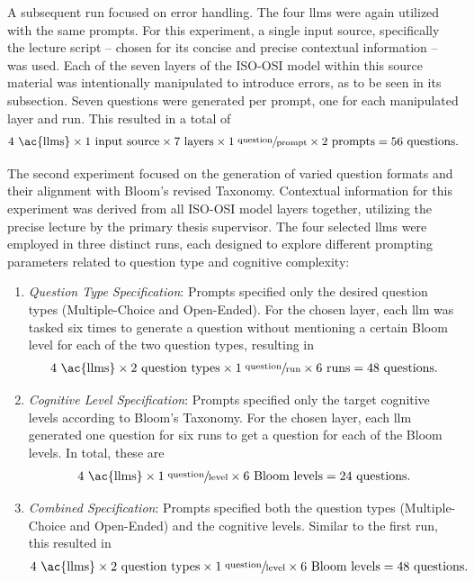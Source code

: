  A subsequent run focused on error handling. The four \ac{llms} were again utilized with the same prompts. For this experiment, a single input source, specifically the lecture script -- chosen for its concise and precise contextual information -- was used. Each of the seven layers of the ISO-OSI model within this source material was intentionally manipulated to introduce errors, as to be seen in its  subsection. Seven questions were generated per prompt, one for each manipulated layer and run. This resulted in a total of \begin{align}4 \text{ \ac{llms}} \times 1 \text{ input source} \times 7 \text{ layers} \times 1 \sfrac{\text{ question}}{\text{prompt}} \times 2 \text{ prompts} = 56 \text{ questions.}\end{align}

\pagebreak

 The second experiment focused on the generation of varied question formats and their alignment with Bloom's revised Taxonomy. Contextual information for this experiment was derived from all ISO-OSI model layers together, utilizing the precise lecture  by the primary thesis supervisor. The four selected \ac{llms} were employed in three distinct runs, each designed to explore different prompting parameters related to question type and cognitive complexity:

\begin{enumerate}
    \item \textit{Question Type Specification}: Prompts specified only the desired question types (Multiple-Choice and Open-Ended). For the chosen layer, each \ac{llm} was tasked six times to generate a question without mentioning a certain Bloom level for each of the two question types, resulting in \begin{align}4 \text{ \ac{llms}} \times 2 \text{ question types} \times 1 \sfrac{\text{ question}}{\text{run}}\times 6 \text{ runs} = 48 \text{ questions.}\end{align}
    \item \textit{Cognitive Level Specification}: Prompts specified only the target cognitive levels according to Bloom's Taxonomy. For the chosen layer, each \ac{llm} generated one question for six runs to get a question for each of the Bloom levels. In total, these are  \begin{align}4 \text{ \ac{llms}} \times 1 \sfrac{\text{ question}}{\text{level}} \times 6 \text{ Bloom levels} = 24 \text{ questions.}\end{align}
    \item \textit{Combined Specification}: Prompts specified both the question types (Multiple-Choice and Open-Ended) and the cognitive levels. Similar to the first run, this resulted in \begin{align}4 \text{ \ac{llms}} \times 2 \text{ question types} \times 1 \sfrac{\text{ question}}{\text{level}} \times 6 \text{ Bloom levels} = 48 \text{ questions.}\end{align}
\end{enumerate}


